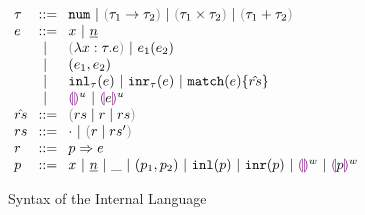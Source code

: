 
\begin{figure}[h]
  $\arraycolsep=4pt\begin{array}{lll}
    \tau & ::= &
      \tnum ~\vert~
      \tarr{\tau_1}{\tau_2} ~\vert~
      \tprod{\tau_1}{\tau_2} ~\vert~
      \tsum{\tau_1}{\tau_2} \\
    e & ::= &
      x ~\vert~
      \hnum{n} \\
      & ~\vert~ &
      \hlam{x}{\tau}{e} ~\vert~
      \hap{e_1}{e_2} \\
      & ~\vert~ &
      \hpair{e_1}{e_2} \\
      & ~\vert~ &
      \hinl{\tau}{e} ~\vert~
      \hinr{\tau}{e} ~\vert~
      \hmatch{e}{\hat{rs}} \\
      & ~\vert~ &
      \hehole{u} ~\vert~
      \hhole{e}{u} \\
    \hat{rs} & ::= &
      \zrulsP{rs}{r}{rs} \\
    rs & ::= &
      \cdot ~\vert~ \hrulesP{r}{rs'} \\
    r & ::= &
      \hrul{p}{e} \\
    p & ::= &
      x ~\vert~
      \hnum{n} ~\vert~
      \_ ~\vert~
      \hpair{p_1}{p_2} ~\vert~
      \hinlp{p} ~\vert~
      \hinrp{p} ~\vert~
      \hehole{w} ~\vert~
      \hhole{p}{w}
    \end{array}$
\caption{Syntax of the Internal Language}
\label{fig:pat-constraint}
\end{figure}
